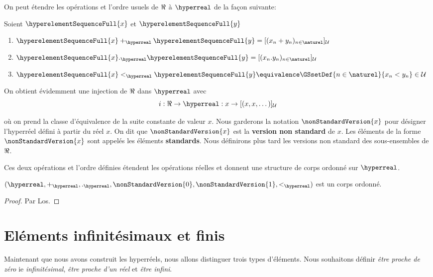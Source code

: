 On peut étendre les opérations et l'ordre usuels de $\real$ à $\hyperreal$ de la façon
suivante:

Soient $\hyperelementSequenceFull{x}$ et $\hyperelementSequenceFull{y}$
\begin{enumerate}
	\item $\hyperelementSequenceFull{x} +_{\hyperreal} \hyperelementSequenceFull{y} = [(x_{n} +
		y_{n})_{n \in \naturel}]_{\mathcal{U}}$
	\item $\hyperelementSequenceFull{x} ._{\hyperreal} \hyperelementSequenceFull{y} = [(x_{n} .
		y_{n})_{n \in \naturel}]_{\mathcal{U}}$
	\item $\hyperelementSequenceFull{x} <_{\hyperreal} \hyperelementSequenceFull{y} \equivalence
		\GSsetDef{n \in \naturel}{x_{n} < y_{n}} \in \mathcal{U}$
\end{enumerate}

On obtient évidemment une injection de $\real$ dans $\hyperreal$ avec
\begin{equation}
	i : \real \rightarrow \hyperreal : x \rightarrow [(x, x, \dots)]_{\mathcal{U}}
\end{equation}

où on prend la classe d'équivalence de la suite constante de valeur $x$. Nous
garderons la notation $\nonStandardVersion{x}$ pour désigner l'hyperréel défini
à partir du réel $x$. On dit que $\nonStandardVersion{x}$ est la \textbf{version
non standard} de $x$. Les éléments de la forme $\nonStandardVersion{x}$ sont
appelés les éléments \textbf{standards}. Nous définirons plus tard les versions
non standard des sous-ensembles de $\real$.

Ces deux opérations et l'ordre définies étendent les opérations réelles et
donnent une structure de corps ordonné sur $\hyperreal$.

\begin{proposition}
	$(\hyperreal, +_{\hyperreal}, ._{\hyperreal}, \nonStandardVersion{0},
	\nonStandardVersion{1},
<_{\hyperreal})$ est un corps ordonné.
\end{proposition}

\ifdefined\outputproof
\begin{proof}
	Par Los.
\end{proof}
\fi

\section{Eléments infinitésimaux et finis}

Maintenant que nous avons construit les hyperréels, nous allons distinguer trois
types d'éléments. Nous souhaitons définir \textit{être proche de zéro} ie
\textit{infinitésimal}, \textit{être proche d'un réel} et \textit{être infini}.

